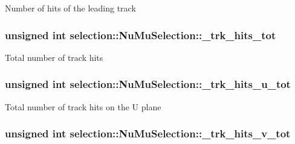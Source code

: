 Number of hits of the leading track \hypertarget{classselection_1_1NuMuSelection_abcc3673c89468d4af37e7936ac5716ea}{
\subsubsection[{\-\_\-trk\-\_\-hits\-\_\-tot}]{\setlength{\rightskip}{0pt plus 5cm}unsigned int selection\-::\-Nu\-Mu\-Selection\-::\-\_\-trk\-\_\-hits\-\_\-tot\hspace{0.3cm}{\ttfamily [private]}}}\label{classselection_1_1NuMuSelection_abcc3673c89468d4af37e7936ac5716ea}
Total number of track hits \hypertarget{classselection_1_1NuMuSelection_ab9a14b2e6823b5309c44d17e343087c6}{
\subsubsection[{\-\_\-trk\-\_\-hits\-\_\-u\-\_\-tot}]{\setlength{\rightskip}{0pt plus 5cm}unsigned int selection\-::\-Nu\-Mu\-Selection\-::\-\_\-trk\-\_\-hits\-\_\-u\-\_\-tot\hspace{0.3cm}{\ttfamily [private]}}}\label{classselection_1_1NuMuSelection_ab9a14b2e6823b5309c44d17e343087c6}
Total number of track hits on the U plane \hypertarget{classselection_1_1NuMuSelection_adf551288be333a585b4fe8b111b8d3dc}{
\subsubsection[{\-\_\-trk\-\_\-hits\-\_\-v\-\_\-tot}]{\setlength{\rightskip}{0pt plus 5cm}unsigned int selection\-::\-Nu\-Mu\-Selection\-::\-\_\-trk\-\_\-hits\-\_\-v\-\_\-tot\hspace{0.3cm}{\ttfamily [private]}}}\label{classselection_1_1NuMuSelection_adf551288be333a585b4fe8b111b8d3dc}
